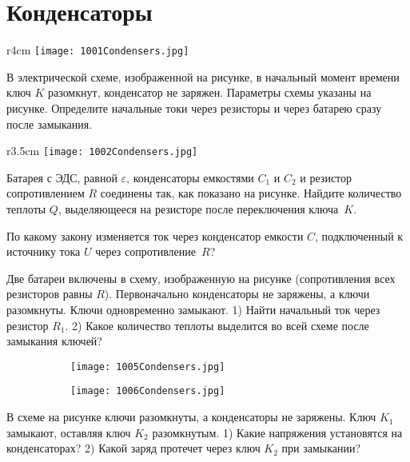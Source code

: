 \section{Конденсаторы}

\begin{wrapfigure}{r}{4cm}
\texttt{[image: 1001Condensers.jpg]}
\end{wrapfigure}

\AddProb В электрической схеме, изображенной на рисунке, в начальный момент времени ключ $K$ разомкнут, конденсатор не заряжен. 
Параметры схемы указаны на рисунке. Определите начальные токи через резисторы и через батарею сразу после замыкания.

\begin{wrapfigure}{r}{3.5cm}
\texttt{[image: 1002Condensers.jpg]}
\end{wrapfigure}

\AddProb Батарея с ЭДС, равной {\Large $\varepsilon$}, конденсаторы емкостями $C_1$ и $C_2$ и резистор сопротивлением $R$ соединены так, как показано на рисунке. 
Найдите количество теплоты $Q$, выделяющееся на резисторе после переключения ключа~$K$.

\AddProb По какому закону изменяется ток через конденсатор емкости $C$, подключенный к источнику тока $U$ через сопротивление~$R$?

\AddProb Две батареи включены в схему, изображенную на рисунке (сопротивления всех резисторов равны $R$). 
Первоначально конденсаторы не заряжены, а ключи разомкнуты. Ключи одновременно замыкают. 
1) Найти начальный ток через резистор $R_1$. 2) Какое количество теплоты выделится во всей схеме после замыкания ключей?

\begin{figure}
	\begin{subfigure}{0.5\textwidth}
	\centering
	\texttt{[image: 1005Condensers.jpg]}
	\end{subfigure}
	\begin{subfigure}{0.5\textwidth}
	\centering
	\texttt{[image: 1006Condensers.jpg]}
	\end{subfigure}
\end{figure}

\AddProb В схеме на рисунке ключи разомкнуты, а конденсаторы не заряжены. Ключ $K_1$ замыкают, оставляя ключ $K_2$ разомкнутым. 
1) Какие напряжения установятся на конденсаторах? 2) Какой заряд протечет через ключ $K_2$ при замыкании?